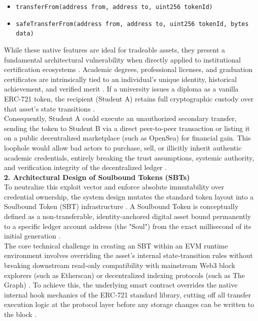 \begin{itemize}
    \item \texttt{transferFrom(address from, address to, uint256 tokenId)}

    \item \texttt{safeTransferFrom(address from, address to, uint256 tokenId, bytes data)}
\end{itemize}

While these native features are ideal for tradeable assets, they present a fundamental architectural vulnerability when directly applied to institutional certification ecosystems \cite{blockchainineducation}. Academic degrees, professional licenses, and graduation certificates are intrinsically tied to an individual's unique identity, historical achievement, and verified merit \cite{kumutha2021blockchainacdaemic}. If a university issues a diploma as a vanilla ERC-721 token, the recipient (Student A) retains full cryptographic custody over that asset's state transitions \cite{perez2020smartcontracts}. \\

Consequently, Student A could execute an unauthorized secondary transfer, sending the token to Student B via a direct peer-to-peer transaction or listing it on a public decentralized marketplace (such as OpenSea) for financial gain. This loophole would allow bad actors to purchase, sell, or illicitly inherit authentic academic credentials, entirely breaking the trust assumptions, systemic authority, and verification integrity of the decentralized ledger \cite{khati2023studentcert}.\\

\textbf{2. Architectural Design of Soulbound Tokens (SBTs)}\\

To neutralize this exploit vector and enforce absolute immutability over credential ownership, the system design mutates the standard token layout into a Soulbound Token (SBT) infrastructure \cite{gasandfeesetheweb}. A Soulbound Token is conceptually defined as a non-transferable, identity-anchored digital asset bound permanently to a specific ledger account address (the "Soul") from the exact millisecond of its initial generation \cite{muhamed2018eductx}.\\

The core technical challenge in creating an SBT within an EVM runtime environment involves overriding the asset’s internal state-transition rules without breaking downstream read-only compatibility with mainstream Web3 block explorers (such as Etherscan) or decentralized indexing protocols (such as The Graph) \cite{nfterc721web}. To achieve this, the underlying smart contract overrides the native internal hook mechanics of the ERC-721 standard library, cutting off all transfer execution logic at the protocol layer before any storage changes can be written to the block \cite{onlinev0835web}.\\

